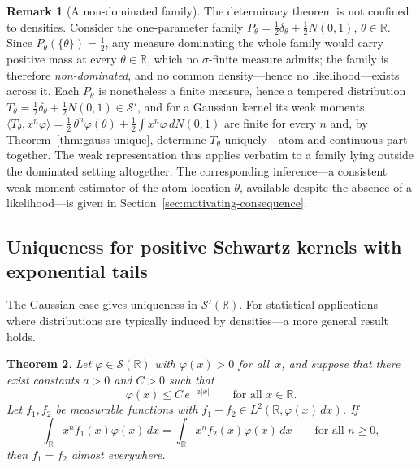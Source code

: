 \documentclass[12pt]{article}
\newtheorem{theorem}{Theorem}[section]
\theoremstyle{definition}
\newtheorem{remark}[theorem]{Remark}
\newcommand{\R}{\mathbb{R}}
\begin{document}
\begin{remark}[A non-dominated family]\label{rem:moving-atom}
The determinacy theorem is not confined to densities.  Consider the
one-parameter family $P_\theta=\tfrac12\delta_\theta+\tfrac12 N(0,1)$,
$\theta\in\R$.  Since $P_\theta(\{\theta\})=\tfrac12$, any measure dominating
the whole family would carry positive mass at every $\theta\in\R$, which no
$\sigma$-finite measure admits; the family is therefore \emph{non-dominated},
and no common density---hence no likelihood---exists across it.  Each
$P_\theta$ is nonetheless a finite measure, hence a tempered distribution
$T_\theta=\tfrac12\delta_\theta+\tfrac12 N(0,1)\in\mathcal{S}'$, and for a
Gaussian kernel its weak moments
$\langle T_\theta,x^n\varphi\rangle
=\tfrac12\,\theta^n\varphi(\theta)+\tfrac12\int x^n\varphi\,dN(0,1)$
are finite for every $n$ and, by Theorem~\ref{thm:gauss-unique}, determine
$T_\theta$ uniquely---atom and continuous part together.  The weak
representation thus applies verbatim to a family lying outside the dominated
setting altogether.  The corresponding inference---a consistent weak-moment
estimator of the atom location $\theta$, available despite the absence of a
likelihood---is given in Section~\ref{sec:motivating-consequence}.
\end{remark}

\subsection{Uniqueness for positive Schwartz kernels with exponential tails}
\label{subsec:positive-unique}

The Gaussian case gives uniqueness in
$\mathcal{S}'(\R)$.  For statistical applications---where distributions
are typically induced by densities---a more general result holds.

\begin{theorem}\label{thm:positive-kernel-unique}
Let $\varphi \in \mathcal{S}(\R)$ with $\varphi(x) > 0$ for all~$x$, and suppose that there exist constants $a > 0$ and $C > 0$ such that
\begin{equation}\label{eq:exp-tail-bound}
  \varphi(x) \leq C\,e^{-a|x|}
  \qquad \text{for all } x \in \R.
\end{equation}
Let $f_1, f_2$ be measurable functions with
$f_1 - f_2 \in L^2(\R, \varphi(x)\,dx)$.  If
\[
  \int_{\R} x^n f_1(x)\varphi(x)\,dx
  = \int_{\R} x^n f_2(x)\varphi(x)\,dx
  \qquad \text{for all } n \geq 0,
\]
then $f_1 = f_2$ almost everywhere.
\end{theorem}
\end{document}
